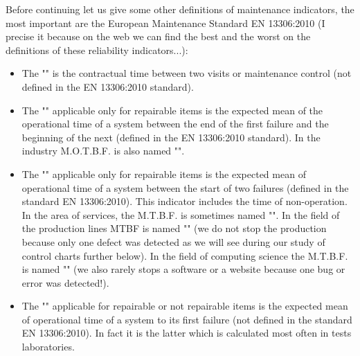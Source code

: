 	Before continuing let us give some other definitions of maintenance indicators, the most important are the European Maintenance Standard EN 13306:2010 (I precise it because on the web we can find the best and the worst on the definitions of these reliability indicators...):
	
	\begin{itemize}
		\item The "" is the contractual time between two visits or maintenance control (not defined in the EN 13306:2010 standard).
		
		\item The "" applicable only for repairable items is the expected mean of the operational time of a system between the end of the first failure and the beginning of the next (defined in the EN 13306:2010 standard). In the industry M.O.T.B.F. is also named "".
		
		\item The "" applicable only for repairable items is the expected mean of operational time of a system between the start of two failures (defined in the standard EN 13306:2010). This indicator includes the time of non-operation. In the area of services, the M.T.B.F. is sometimes named "". In the field of the production lines MTBF is named "" (we do not stop the production because only one defect was detected as we will see during our study of control charts further below). In the field of computing science the M.T.B.F. is named "" (we also rarely stops a software or a website because one bug or error was detected!).
		
		\item The "" applicable for repairable or not repairable items is the expected mean of operational time of a system to its first failure (not defined in the standard EN 13306:2010). In fact it is the latter which is calculated most often in tests laboratories.
		

\end{itemize}

